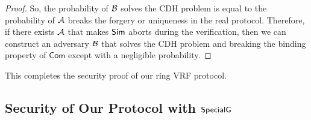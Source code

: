 \begin{proof}
	So, the probability of $ \mathcal{B} $ solves the CDH problem is equal to the probability of $ \mathcal{A} $ breaks the forgery or uniqueness in the real protocol. Therefore,  if there exists $ \mathcal{A} $ that makes $ \mathsf{Sim}$ aborts during the verification, then we can construct an adversary $ \mathcal{B} $ that solves the CDH problem and breaking the binding property of $ \mathsf{Com} $ except with a negligible probability.
	
	
	
\end{proof}
This completes the security proof of our ring VRF protocol.\eprint{ \qed}{\qed}



\subsection{Security of Our Protocol with $ {\mathsf{SpecialG}} $}
\label{ap:secondprotocolproof}
%



